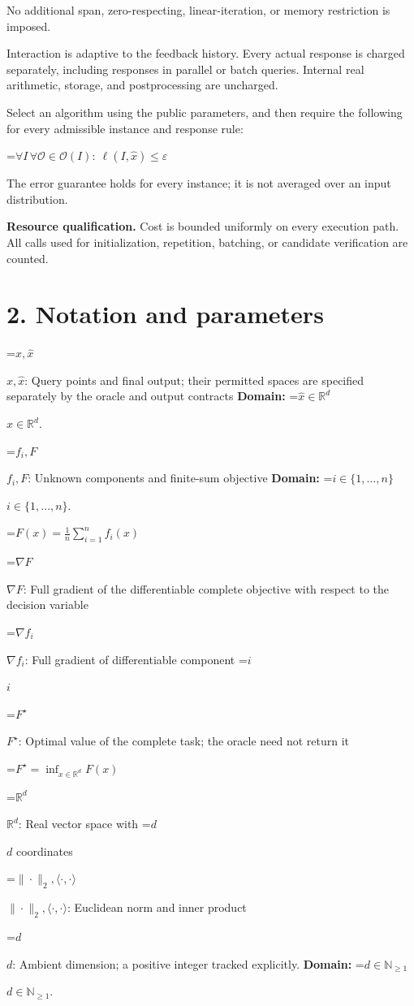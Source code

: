 \documentclass[10pt,a4paper]{article}
\newcommand{\AtlasMath}[1]{\par\begingroup\centering\setbox0=\hbox{$\displaystyle #1$}\ifdim\wd0>1.4\linewidth\typeout{ATLAS WIDE FORMULA: \the\wd0}\fi\ifdim\wd0>\linewidth\resizebox{\linewidth}{!}{\box0}\else\box0\fi\par\endgroup}
\newcommand{\AtlasInlineMath}[1]{\begingroup\setbox0=\hbox{$#1$}\ifdim\wd0>.4\linewidth\endgroup\AtlasMath{#1}\else\endgroup$#1$\fi}
\begin{document}
No additional span, zero-respecting, linear-iteration, or memory restriction is imposed.

Interaction is adaptive to the feedback history. Every actual response is charged separately, including responses in parallel or batch queries. Internal real arithmetic, storage, and postprocessing are uncharged.

Select an algorithm using the public parameters, and then require the following for every admissible instance and response rule:


\AtlasMath{\forall I\,\forall\mathcal{O}\in\mathcal{O}(I):\ \ell(I,\widehat{x})\le\varepsilon}


The error guarantee holds for every instance; it is not averaged over an input distribution.

\textbf{Resource qualification.} Cost is bounded uniformly on every execution path. All calls used for initialization, repetition, batching, or candidate verification are counted.

\section{2. Notation and parameters}
\AtlasInlineMath{x,\widehat{x}}: Query points and final output; their permitted spaces are specified separately by the oracle and output contracts \textbf{Domain:} \AtlasInlineMath{\widehat{x}\in \mathbb{R}^d}.

\AtlasInlineMath{f_i,F}: Unknown components and finite-sum objective \textbf{Domain:} \AtlasInlineMath{i\in\{1,\ldots,n\}}.


\AtlasMath{F(x)=\frac1n\sum_{i=1}^n f_i(x)}


\AtlasInlineMath{\nabla F}: Full gradient of the differentiable complete objective with respect to the decision variable

\AtlasInlineMath{\nabla f_i}: Full gradient of differentiable component \AtlasInlineMath{i}

\AtlasInlineMath{F^\star}: Optimal value of the complete task; the oracle need not return it


\AtlasMath{F^\star=\inf_{x\in \mathbb{R}^d}F(x)}


\AtlasInlineMath{\mathbb{R}^d}: Real vector space with \AtlasInlineMath{d} coordinates

\AtlasInlineMath{\|\cdot\|_2,\langle\cdot,\cdot\rangle}: Euclidean norm and inner product

\AtlasInlineMath{d}: Ambient dimension; a positive integer tracked explicitly. \textbf{Domain:} \AtlasInlineMath{d\in\mathbb{N}_{\ge1}}.
\end{document}
